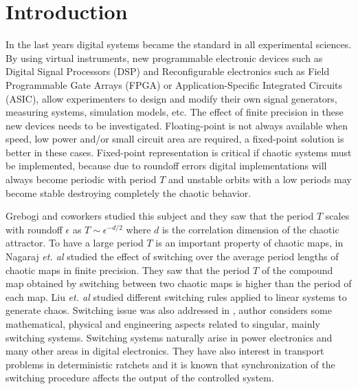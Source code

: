\section{Introduction} \label{sec:intro}

In the last years digital systems became the standard in all experimental sciences.
By using virtual instruments, new programmable electronic devices such as Digital Signal Processors (DSP) and Reconfigurable electronics such as Field Programmable Gate Arrays (FPGA) or Application-Specific Integrated Circuits (ASIC), allow experimenters to design and modify their own signal generators, measuring systems, simulation models, etc.
The effect of finite precision in these new devices needs to be investigated.
Floating-point is not always available when speed, low power and/or small circuit area are required, a fixed-point solution is better in these cases.
Fixed-point representation is critical if chaotic systems must be implemented, because due to roundoff errors digital implementations will always become periodic with period $T$ and unstable orbits with a low periods may become stable destroying completely the chaotic behavior.

Grebogi and coworkers \cite{Grebogi1988} studied this subject and they saw that the period $T$ scales with roundoff $\epsilon$ as $T\sim\epsilon^{-d/2}$ where $d$ is the correlation dimension of the chaotic attractor.
To have a large period $T$ is an important property of chaotic maps, in \cite{Nagaraj2008} Nagaraj \textit{et. al} studied the effect of switching over the average period lengths of chaotic maps in finite precision.
They saw that the period $T$ of the compound map obtained by switching between two chaotic maps is higher than the period of each map.
Liu \textit{et. al} \cite{Liu2006} studied different switching rules applied to linear systems to generate chaos.
Switching issue was also addressed in \cite{Gluskin2008}, author considers some mathematical, physical and engineering aspects related to singular, mainly switching systems.
Switching systems naturally arise in power electronics and many other areas in digital electronics.
They have also interest in transport problems in deterministic ratchets \cite{Zarlenga2009} and it is known that synchronization of the switching procedure affects the output of the controlled system.

